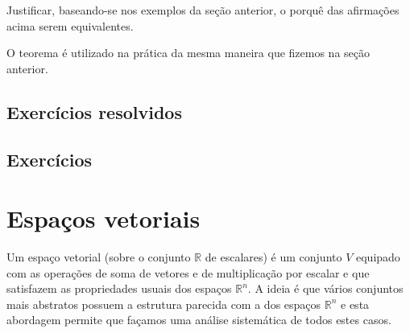 \begin{exer}
	Justificar, baseando-se nos exemplos da seção anterior, o porquê das afirmações acima serem equivalentes.
\end{exer}

O teorema é utilizado na prática da mesma maneira que fizemos na seção anterior.


\subsection*{Exercícios resolvidos}

\construirExeresol

\subsection*{Exercícios}

\construirExer


\section{Espaços vetoriais}


Um espaço vetorial (sobre o conjunto $\mathbb{R}$ de escalares) é um conjunto $V$ equipado com as operações de soma de vetores e de multiplicação por escalar e que satisfazem as propriedades usuais dos espaços $\mathbb{R}^n$. A ideia é que vários conjuntos mais abstratos possuem a estrutura parecida com a dos espaços $\mathbb{R}^n$ e esta abordagem permite que façamos uma análise sistemática de todos estes casos.

